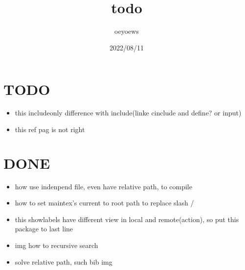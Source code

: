 \documentclass[UTF8]{article}
\title{todo \emoji{check-mark-button}}
\author{oeyoews}
\date{2022/08/11}
\begin{document}
\maketitle

\section{TODO }%
\label{sec:TODO}

\begin{itemize}
	\item this includeonly difference with include(linke cinclude and define? or
	      input)
	\item this ref pag is not right
\end{itemize}

\section{DONE}%
\label{sec:DONE}

\begin{itemize}
	\item how use indenpend file, even have relative path, to compile
	\item how to set maintex's current to root path to replace slash /
	\item this showlabels have different view in local and remote(action), so put
	      this package to last line
	\item img how to recursive search
	\item solve relative path, such bib img
\end{itemize}
\end{document}
